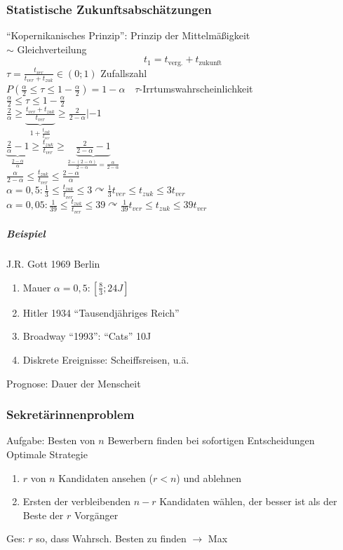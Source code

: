 \documentclass[a4paper]{scrartcl}
\begin{document}
\subsubsection{Statistische Zukunftsabschätzungen}
"`Kopernikanisches Prinzip"': Prinzip der Mittelmäßigkeit\\
$\sim$ Gleichverteilung
\[ t_1 = t_{\text{verg.}} + t_{\text{zukunft}}\]
$\tau = \frac{t_{ver}}{t_{ver} + t_{zuk}} \in (0;1)$ Zufallszahl\\
$P(\frac{\alpha}{2} \leq \tau \leq 1- \frac{\alpha}{2}) = 1 - \alpha \quad \tau$-Irrtumswahrscheinlichkeit\\
$\frac{\alpha}{2} \leq \tau \leq 1 - \frac{\alpha}{2}$\\
$\frac{2}{\alpha} \geq \underbrace{\frac{t_{ver} + t_{zuk}}{t_{ver}}}_{1+ \frac{t_{zuk}}{t_{ver}}} \geq \frac{2}{2 - \alpha} | -1$\\
$\underbrace{\frac{2}{\alpha}-1}_{\frac{2-\alpha}{\alpha}} \geq \frac{t_{zuk}}{t_{ver}} \geq \underbrace{\frac{2}{2-\alpha} -1}_{\frac{2-(2-\alpha)}{2-\alpha} = \frac{\alpha}{2-\alpha}}$\\
$\frac{\alpha}{2-\alpha} \leq \frac{t_{zuk}}{t_{ver}} \leq \frac{2-\alpha}{\alpha}$\\
$\alpha = 0,5: \frac{1}{3} \leq \frac{t_{zuk}}{t_{ver}} \leq 3 \curvearrowright \frac{1}{3} t_{ver} \leq t_{zuk} \leq 3 t_{ver}$\\
$\alpha = 0,05 : \frac{1}{39} \leq \frac{t_{zuk}}{t_{ver}} \leq 39 \curvearrowright \frac{1}{39} t_{ver} \leq t_{zuk} \leq 39 t_{ver}$
\subparagraph{Beispiel} J.R. Gott 1969 Berlin
\begin{enumerate}
\item Mauer $\alpha = 0,5 : [ \frac{8}{3}; 24J]$
\item Hitler 1934 "`Tausendjähriges Reich"'
\item Broadway "`1993"': "`Cats"' 10J
\item Diskrete Ereignisse: Scheiffsreisen, u.ä.
\end{enumerate}
Prognose: Dauer der Menscheit

\subsubsection{Sekretärinnenproblem}
Aufgabe: Besten von $n$ Bewerbern finden bei sofortigen Entscheidungen\\
Optimale Strategie
\begin{enumerate}
\item $r$ von $n$ Kandidaten ansehen ($r < n$) und ablehnen
\item Ersten der verbleibenden $n-r$ Kandidaten wählen, der besser ist als der Beste der $r$ Vorgänger
\end{enumerate}
Ges: $r$ so, dass Wahrsch. Besten zu finden $\rightarrow$ Max
\end{document}
